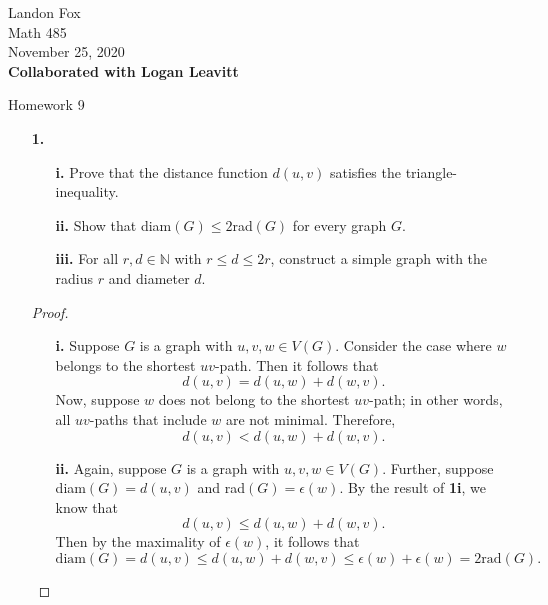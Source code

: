 \documentclass[ 12pt ]{article}
\begin{document}
\noindent Landon Fox \\
\noindent Math 485 \\
\noindent November 25, 2020 \\
\noindent \textbf{Collaborated with Logan Leavitt}

\begin{center}
	\Large Homework 9
\end{center}

\begin{enumerate}
	\item[\textbf{1.}]
		\begin{enumerate}
			\item[\textbf{i.}] Prove that the distance function $d(u, v)$ satisfies the triangle-inequality.
			\item[\textbf{ii.}] Show that diam$(G) \leq 2$rad$(G)$ for every graph $G$.
			\item[\textbf{iii.}] For all $r, d \in \mathbb{N}$ with $r \leq d \leq 2r$, construct a simple graph with the radius $r$ and diameter $d$.
		\end{enumerate}

		\begin{proof}
			\begin{enumerate}
				\item[\textbf{i.}] Suppose $G$ is a graph with $u, v, w \in V(G)$. Consider the case where $w$ belongs to the shortest $uv$-path. Then it follows that $$d(u, v) =
					d(u, w) + d(w, v).$$ Now, suppose $w$ does not belong to the shortest $uv$-path; in other words, all $uv$-paths that include $w$ are not minimal. Therefore,
					$$d(u, v) < d(u, w) + d(w, v).$$

				\item[\textbf{ii.}] Again, suppose $G$ is a graph with $u, v, w \in V(G)$. Further, suppose diam$(G) = d(u, v)$ and rad$(G) = \epsilon(w)$. By the result of \textbf{1i},
					we know that $$d(u, v) \leq d(u, w) + d(w, v).$$ Then by the maximality of $\epsilon(w)$, it follows that $$\mathrm{diam}(G) = d(u, v) \leq d(u, w) + d(w, v) \leq
					\epsilon(w) + \epsilon(w) = 2\mathrm{rad}(G).$$


\end{enumerate}
\end{proof}
\end{enumerate}
\end{document}
